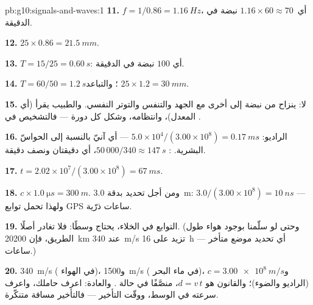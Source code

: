 \begin{solution}{pb:g10:signals-and-waves:1}
\textbf{11.} $f = 1/0.86 = \qty{1.16}{Hz}$، أي\ $1.16 \times 60
\approx 70$ نبضة في الدقيقة.

\textbf{12.} $25 \times 0.86 = \qty{21.5}{mm}$.

\textbf{13.} $T = 15/25 = \qty{0.60}{s}$: أي $100$ نبضة في الدقيقة.

\textbf{14.} $T = 60/50 = \qty{1.2}{s}$؛ والتباعد
$25 \times 1.2 = \qty{30}{mm}$.

\textbf{15.} لا:  ينزاح من نبضة إلى أخرى مع الجهد
والتنفس والتوتر النفسي. والطبيب يقرأ  (أي المعدل)،
وانتظامه، وشكل كل دورة --- فالتشخيص في
.

\textbf{16.} الراديو: $5.0\times10^{4}/(3.00\times10^{8}) =
\qty{0.17}{ms}$ --- أي آنيّ بالنسبة إلى الحواسّ البشرية. :
$50\,000/340 \approx \qty{147}{s}$، أي دقيقتان ونصف دقيقة.

\textbf{17.} $t = 2.02\times10^{7}/(3.00\times10^{8}) = \qty{67}{ms}$.

\textbf{18.} $c \times \qty{1.0}{\micro s} = \qty{300}{m}$. ومن أجل تحديد
بدقة \qty{3.0}{m}: $3.0/(3.00\times10^{8}) = \qty{10}{ns}$ --- ولهذا
تحمل توابع GPS ساعات ذرّية.

\textbf{19.} التوابع في الخلاء،  يحتاج وسطًا: فلا
 تغادر  أصلًا. (وحتى لو سلّمنا بوجود هواء طول
الطريق، فإن \qty{20200}{km} عند \qty{340}{m/s} تزيد على \qty{16}{h} --- أي
تحديد موضع متأخر ساعات.)

\textbf{20.} \qty{340}{m/s} ( في الهواء)، و\qty{1500}{m/s} ( في
ماء البحر)، و$c = \qty{3.00e8}{m/s}$ (الراديو والضوء)؛ والقانون هو
$d = v\,t$، منصَّفًا في حالة . والعادة: اعرف حاملك، واعرف
سرعته في الوسط، ووقّت التأخير --- فالتأخير مسافة
متنكّرة.
\end{solution}
